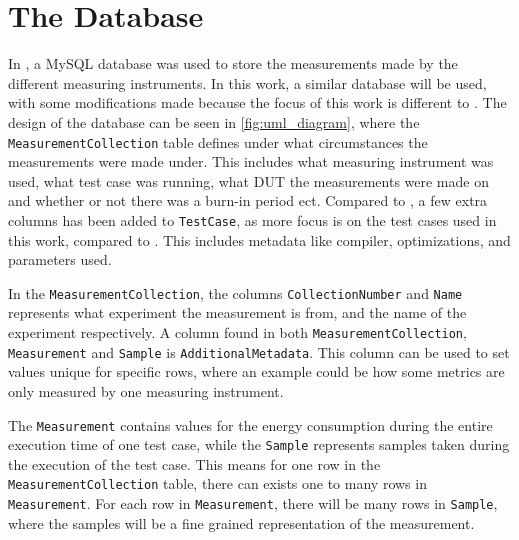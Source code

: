 \section{The Database}

In \cite{biksbois}, a MySQL database was used to store the measurements made by the different measuring instruments. In this work, a similar database will be used, with some modifications made because the focus of this work is different to \cite{biksbois}. The design of the database can be seen in \cref{fig:uml_diagram}, where the \texttt{MeasurementCollection} table defines under what circumstances the measurements were made under. This includes what measuring instrument was used, what test case was running, what DUT the measurements were made on and whether or not there was a burn-in period ect. Compared to \cite{biksbois}, a few extra columns has been added to \texttt{TestCase}, as more focus is on the test cases used in this work, compared to \cite{biksbois}. This includes metadata like compiler, optimizations, and parameters used.


In the \texttt{MeasurementCollection}, the columns \texttt{CollectionNumber} and \texttt{Name} represents what experiment the measurement is from, and the name of the experiment respectively. A column found in both \texttt{MeasurementCollection}, \texttt{Measurement} and \texttt{Sample} is \texttt{AdditionalMetadata}. This column can be used to set values unique for specific rows, where an example could be how some metrics are only measured by one measuring instrument.



The \texttt{Measurement} contains values for the energy consumption during the entire execution time of one test case, while the \texttt{Sample} represents samples taken during the execution of the test case. This means for one row in the \texttt{MeasurementCollection} table, there can exists one to many rows in \texttt{Measurement}. For each row in \texttt{Measurement}, there will be many rows in \texttt{Sample}, where the samples will be a fine grained representation of the measurement.


